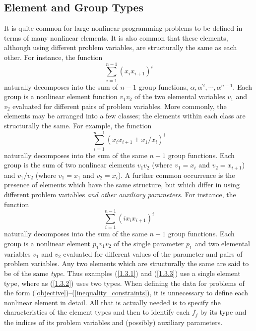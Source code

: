 \documentclass[a4paper]{article}
\newcommand{\beqn}[1]{\begin{equation}\label{#1}}
\newcommand{\eeqn}{\end{equation}}
\newcommand{\req}[1]{(\ref{#1})}
\begin{document}
\subsection{\label{S1.3}Element and Group Types}

It is quite  common  for   large nonlinear programming  problems to be
defined in terms of many nonlinear elements.
It is   also  common  that these   elements, although using  different
problem variables,  are structurally  the  same  as each  other.   For
instance, the function
\beqn{1.3.1}
\sum_{i = 1}^{n-1} (x_i x_{i + 1})^i
\eeqn
naturally decomposes into the sum of $n-1$ group functions,
$\alpha, \alpha^2, \cdots , \alpha^{n-1}$.
Each group
is a  nonlinear  element  function
$v_1 v_2$   of the  two  elemental variables
$v_1$  and $v_  2$ evaluated for  different pairs of problem
variables.
More commonly, the elements  may be arranged  into  a  few
classes; the  elements  within each class are  structurally  the same.
For example, the function
\beqn{1.3.2}
\sum_{i = 1}^{n-1} (x_i x_{i + 1} + x_1/x_i)^i
\eeqn
naturally decomposes into the sum of the same $n-1$ group functions.
Each group is the sum  of two nonlinear elements $v_1  v_2$ (where $v_1
= x_i$ and  $v_2 = x_{i+1}$) and $v_1 / v_2$ (where $v_1 = x_1$ and  $v_2 =
 x_{i}$).
A further common occurrence is the presence of elements which have the
same structure,
but which differ in using different problem variables
{\em and other auxiliary parameters}.
For instance, the function
\beqn{1.3.3}
\sum_{i = 1}^{n-1} (ix_i x_{i + 1})^i
\end{equation}
naturally decomposes into the sum of the same $n-1$ group functions.
Each  group is a  nonlinear  element
$p_1   v_1 v_2$  of the   single  parameter
$p_1$   and two elemental variables
$v_1$  and  $v_2$ evaluated  for  different  values of  the
parameter and pairs of problem variables.
Any two elements which are structurally the same are said to be of the
same {\em type.}
Thus  examples \req{1.3.1} and  \req{1.3.3} use a single element type,
where  as  \req{1.3.2} uses two   types.  When  defining the data  for
problems of the form \req{objective}--\req{inequality_constraints}, it
is unnecessary to define each nonlinear element in detail. All that is
actually needed is to specify the characteristics of the element types
and then to  identify each $f_j$  by its  type and the indices  of its
problem variables and (possibly) auxiliary parameters.
\end{document}
